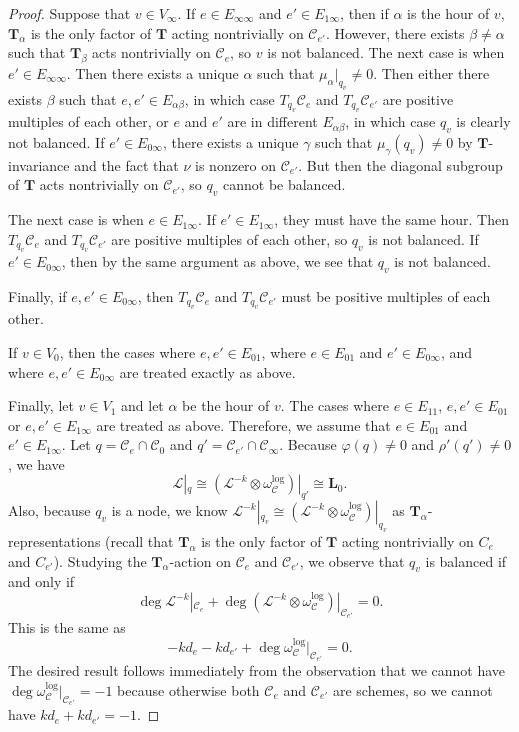 \documentclass{amsart}
\theoremstyle{definition}
\theoremstyle{remark}
\theoremstyle{plain}
\theoremstyle{definition}
\theoremstyle{remark}
\newcommand{\T}{\mathbf{T}}
\newcommand{\mc}[1]{\mathcal{#1}}
\newcommand{\mbf}[1]{\mathbf{#1}}
\newcommand{\1}{\mathbf{1}}
\newcommand{\2}{\mathbf{2}}
\newcommand{\3}{\mathbf{3}}
\begin{document}
\begin{proof}
    Suppose that $v \in V_{\infty}$. If $e \in E_{\infty\infty}$ and $e' \in E_{1\infty}$, then if $\alpha$ is the hour of $v$, $\T_{\alpha}$ is the only factor of $\T$ acting nontrivially on $\mc{C}_{e'}$. However, there exists $\beta \neq \alpha$ such that $\T_{\beta}$ acts nontrivially on $\mc{C}_e$, so $v$ is not balanced. The next case is when $e' \in E_{\infty\infty}$. Then there exists a unique $\alpha$ such that $\mu_{\alpha}|_{q_v} \neq 0$. Then either there exists $\beta$ such that $e,e' \in E_{\alpha\beta}$, in which case $T_{q_v} \mc{C}_e$ and $T_{q_v} \mc{C}_{e'}$ are positive multiples of each other, or $e$ and $e'$ are in different $E_{\alpha\beta}$, in which case $q_v$ is clearly not balanced. If $e' \in E_{0\infty}$, there exists a unique $\gamma$ such that $\mu_{\gamma}(q_v) \neq 0$ by $\T$-invariance and the fact that $\nu$ is nonzero on $\mc{C}_{e'}$. But then the diagonal subgroup of $\T$ acts nontrivially on $\mc{C}_{e'}$, so $q_v$ cannot be balanced.

    The next case is when $e \in E_{1\infty}$. If $e' \in E_{1\infty}$, they must have the same hour. Then $T_{q_v} \mc{C}_e$ and $T_{q_v} \mc{C}_{e'}$ are positive multiples of each other, so $q_v$ is not balanced. If $e' \in E_{0\infty}$, then by the same argument as above, we see that $q_v$ is not balanced.

    Finally, if $e, e' \in E_{0\infty}$, then $T_{q_v} \mc{C}_e$ and $T_{q_v} \mc{C}_{e'}$ must be positive multiples of each other.

    If $v \in V_0$, then the cases where $e, e' \in E_{01}$, where $e \in E_{01}$ and $e' \in E_{0\infty}$, and where $e, e' \in E_{0\infty}$ are treated exactly as above.

    Finally, let $v \in V_1$ and let $\alpha$ be the hour of $v$. The cases where $e \in E_{11}$, $e,e' \in E_{01}$ or $e,e' \in E_{1\infty}$ are treated as above. Therefore, we assume that $e \in E_{01}$ and $e' \in E_{1\infty}$. Let $q = \mc{C}_e \cap \mc{C}_0$ and $q' = \mc{C}_{e'} \cap \mc{C}_{\infty}$. Because $\varphi(q) \neq 0$ and $\rho'(q') \neq 0$, we have 
    \[ \mc{L}|_q \cong (\mc{L}^{-k} \otimes \omega_{\mc{C}}^{\log})|_{q'} \cong \mbf{L}_0. \] 
    Also, because $q_v$ is a node, we know $\mc{L}^{-k}|_{q_v} \cong (\mc{L}^{-k} \otimes \omega^{\log}_{\mc{C}})|_{q_v}$ as $\T_{\alpha}$-representations (recall that $\T_{\alpha}$ is the only factor of $\T$ acting nontrivially on $C_e$ and $C_{e'}$). Studying the $\T_{\alpha}$-action on $\mc{C}_e$ and $\mc{C}_{e'}$, we observe that $q_v$ is balanced if and only if
    \[ \deg \mc{L}^{-k} |_{\mc{C}_e} + \deg (\mc{L}^{-k} \otimes \omega^{\log}_{\mc{C}})|_{\mc{C}_{e'}} = 0. \]
    This is the same as 
    \[ -k d_e - k d_{e'} + \deg \omega^{\log}_{\mc{C}}|_{\mc{C}_{e'}} = 0. \]
    The desired result follows immediately from the observation that we cannot have $\deg \omega^{\log}_{\mc{C}}|_{\mc{C}_{e'}} = -1$ because otherwise both $\mc{C}_e$ and $\mc{C}_{e'}$ are schemes, so we cannot have $k d_e + k d_{e'} = -1$.
\end{proof}
\end{document}
